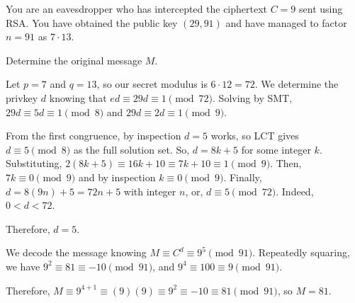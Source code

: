 \documentclass{agony}
\begin{document}
\begin{prob}
  You are an eavesdropper who has intercepted the ciphertext $C = 9$ sent using RSA\@.
  You have obtained the public key $(29, 91)$ and have managed to factor $n = 91$ as $7 \cdot 13$.

  Determine the original message $M$.
\end{prob}
\begin{sol}
  Let $p = 7$ and $q = 13$, so our secret modulus is $6 \cdot 12 = 72$.
  We determine the privkey $d$ knowing that $ed \equiv 29d \equiv 1 \pmod{72}$.
  Solving by SMT, $29d \equiv 5d \equiv 1 \pmod{8}$ and $29d \equiv 2d \equiv 1 \pmod{9}$.

  From the first congruence, by inspection $d=5$ works, so LCT gives $d\equiv 5 \pmod 8$ as the full solution set. So, $d = 8k + 5$ for some integer $k$.
  Substituting, $2(8k + 5) \equiv 16k + 10 \equiv 7k + 10 \equiv 1 \pmod{9}$.
  Then, $7k \equiv 0 \pmod{9}$ and by inspection $k \equiv 0 \pmod{9}$.
  Finally, $d = 8(9n) + 5 = 72n + 5$ with integer $n$, or, $d \equiv 5 \pmod{72}$. Indeed, $0<d<72$.
  
  Therefore, $d = 5$.

  We decode the message knowing $M \equiv C^d \equiv 9^{5} \pmod{91}$.
  Repeatedly squaring, we have $9^2 \equiv 81 \equiv -10 \pmod{91}$, and $9^4 \equiv 100 \equiv 9 \pmod{91}$.

  Therefore, $M \equiv 9^{4+1} \equiv (9)(9) \equiv 9^2 \equiv -10 \equiv 81 \pmod{91}$, so $M = 81$.
\end{sol}
\end{document}
